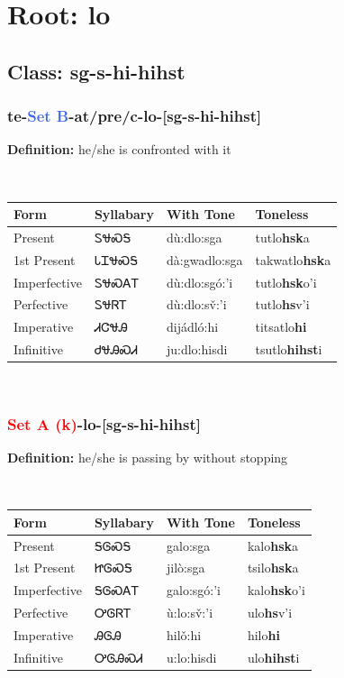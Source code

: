 \needspace{4in}
\section*{Root: lo}
\nopagebreak
{}
\needspace{3in}
\subsection*{Class: sg-s-hi-hihst}
\nopagebreak
\needspace{2in}
\subsubsection*{te{-}\textcolor{RoyalBlue}{Set B}{-}at/pre/c{-}\textbf{lo}{-}[sg-s-hi-hihst]}
\nopagebreak
\textbf{Definition: } he/she is confronted with it
\\[0.5em]
\begin{tabularx}{\textwidth}{l X X X}%
\toprule%
\textbf{Form}&\textbf{Syllabary}&\textbf{With Tone}&\textbf{Toneless}\\%
\midrule%
Present&ᏚᏠᏍᎦ&dù:dlo:sga&tutlo\textbf{hsk}a\\%
1st Present&ᏓᏆᏠᏍᎦ&dà:gwadlo:sga&takwatlo\textbf{hsk}a\\%
Imperfective&ᏚᏠᏍᎪᎢ&dù:dlo:sgó:’i&tutlo\textbf{hsk}o'i\\%
Perfective&ᏚᏠᏒᎢ&dù:dlo:sv̌:’i&tutlo\textbf{hs}v'i\\%
Imperative&ᏗᏣᏠᎯ&dijádló:hi&titsatlo\textbf{hi}\\%
Infinitive&ᏧᏠᎯᏍᏗ&ju:dlo:hisdi&tsutlo\textbf{hihst}i\\%
\bottomrule%
\end{tabularx}
\\[1em]
\needspace{2in}
\subsubsection*{\textcolor{Red}{Set A (k)}{-}\textbf{lo}{-}[sg-s-hi-hihst]}
\nopagebreak
\textbf{Definition: } he/she is passing by without stopping
\\[0.5em]
\begin{tabularx}{\textwidth}{l X X X}%
\toprule%
\textbf{Form}&\textbf{Syllabary}&\textbf{With Tone}&\textbf{Toneless}\\%
\midrule%
Present&ᎦᎶᏍᎦ&galo:sga&kalo\textbf{hsk}a\\%
1st Present&ᏥᎶᏍᎦ&jilò:sga&tsilo\textbf{hsk}a\\%
Imperfective&ᎦᎶᏍᎪᎢ&galo:sgó:’i&kalo\textbf{hsk}o'i\\%
Perfective&ᎤᎶᏒᎢ&ù:lo:sv̌:’i&ulo\textbf{hs}v'i\\%
Imperative&ᎯᎶᎯ&hilǒ:hi&hilo\textbf{hi}\\%
Infinitive&ᎤᎶᎯᏍᏗ&u:lo:hisdi&ulo\textbf{hihst}i\\%
\bottomrule%
\end{tabularx}
\\[1em]
\needspace{2in}
